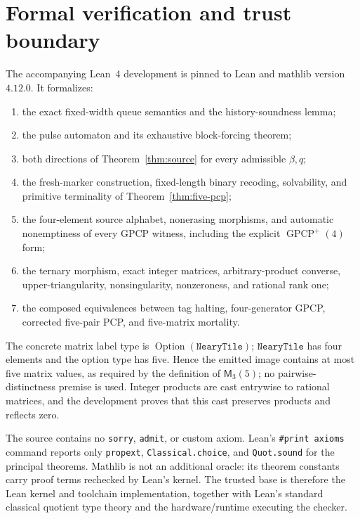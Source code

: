 \documentclass[11pt]{article}
\newcommand{\Mort}{\mathsf{M}}
\begin{document}
\section{Formal verification and trust boundary}

The accompanying Lean~4 development is pinned to Lean and mathlib version $4.12.0$.  It
formalizes:
\begin{enumerate}
  \item the exact fixed-width queue semantics and the history-soundness lemma;
  \item the pulse automaton and its exhaustive block-forcing theorem;
  \item both directions of Theorem~\ref{thm:source} for every admissible $\beta,q$;
  \item the fresh-marker construction, fixed-length binary recoding, solvability, and
        primitive terminality of Theorem~\ref{thm:five-pcp};
  \item the four-element source alphabet, nonerasing morphisms, and automatic nonemptiness
        of every GPCP witness, including the explicit $\operatorname{GPCP}^{+}(4)$ form;
  \item the ternary morphism, exact integer matrices, arbitrary-product converse,
        upper-triangularity, nonsingularity, nonzeroness, and rational rank one;
  \item the composed equivalences between tag halting, four-generator GPCP, corrected
        five-pair PCP, and five-matrix mortality.
\end{enumerate}
The concrete matrix label type is $\operatorname{Option}(\texttt{NearyTile})$;
$\texttt{NearyTile}$ has four elements and the option type has five.  Hence the emitted image
contains at most five matrix values, as required by the definition of $\Mort_3(5)$; no
pairwise-distinctness premise is used.  Integer products are cast entrywise to rational
matrices, and the development proves that this cast preserves products and reflects zero.

The source contains no \texttt{sorry}, \texttt{admit}, or custom axiom.  Lean's
\texttt{\#print axioms} command reports only \texttt{propext},
\texttt{Classical.choice}, and \texttt{Quot.sound} for the principal theorems.  Mathlib is
not an additional oracle: its theorem constants carry proof terms rechecked by Lean's kernel.
The trusted base is therefore the Lean kernel and toolchain implementation, together with
Lean's standard classical quotient type theory and the hardware/runtime executing the checker.
\end{document}
